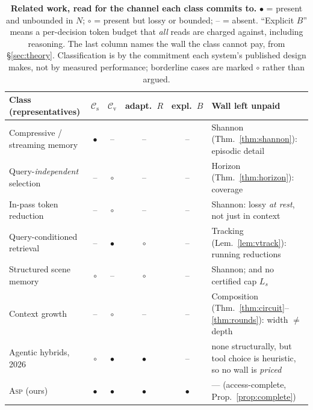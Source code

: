 \documentclass[10pt]{article}
\theoremstyle{definition}
\theoremstyle{plain}
\newcommand{\cmark}{\textcolor{crouter}{$\bullet$}}
\newcommand{\pmark}{\textcolor{cwall}{$\circ$}}
\newcommand{\xmark}{\textcolor{cverb}{--}}
\newcommand{\ASP}{\textsc{Asp}}
\newcommand{\cs}{\mathcal{C}_{\mathrm{s}}}
\newcommand{\cv}{\mathcal{C}_{\mathrm{v}}}
\begin{document}
\begin{table}[!t]
\centering\small\setlength{\tabcolsep}{4pt}
\caption{\textbf{Related work, read for the channel each class commits to.} \cmark{} = present and unbounded in $N$; \pmark{} = present but lossy or bounded; \xmark{} = absent. ``Explicit $B$'' means a per-decision token budget that \emph{all} reads are charged against, including reasoning. The last column names the wall the class cannot pay, from \S\ref{sec:theory}. Classification is by the commitment each system's published design makes, not by measured performance; borderline cases are marked \pmark{} rather than argued.}
\label{tab:related}
\begin{tabular}{p{5.05cm}cccc>{\raggedright\arraybackslash}p{4.05cm}}
\toprule
Class (representatives) & $\cs$ & $\cv$ & adapt.\ $R$ & expl.\ $B$ & Wall left unpaid \\
\midrule
Compressive / streaming memory
 \citep{moviechat,malmm,flashvstream}
 & \cmark & \xmark & \xmark & \xmark & Shannon (Thm.~\ref{thm:shannon}): episodic detail \\
Query-\emph{independent} selection
 \citep{videotree,llovi,openeqa}
 & \xmark & \pmark & \xmark & \xmark & Horizon (Thm.~\ref{thm:horizon}): coverage \\
In-pass token reduction
 \citep{fastv,prumerge,tosa}
 & \xmark & \pmark & \xmark & \xmark & Shannon: lossy \emph{at rest}, not just in context \\
Query-conditioned retrieval
 \citep{videoagent,goldfish,videorag,vgent}
 & \xmark & \cmark & \pmark & \xmark & Tracking (Lem.~\ref{lem:vtrack}): running reductions \\
Structured scene memory
 \citep{graphpad,sayplan,conceptgraphs}
 & \pmark & \xmark & \pmark & \xmark & Shannon; and no certified cap $L_s$ \\
Context growth
 \citep{ringattention,lwm,longva}
 & \xmark & \pmark & \xmark & \xmark & Composition (Thm.~\ref{thm:circuit}--\ref{thm:rounds}): width $\neq$ depth \\
Agentic hybrids, 2026
 \citep{egagent,worldmm,streameqa}
 & \pmark & \cmark & \cmark & \xmark & none structurally, but tool choice is heuristic, so no wall is \emph{priced} \\
\midrule
\ASP{} (ours) & \cmark & \cmark & \cmark & \cmark & --- (access-complete, Prop.~\ref{prop:complete}) \\
\bottomrule
\end{tabular}
\end{table}
\end{document}
